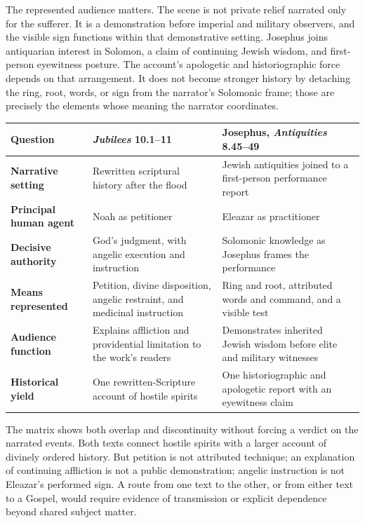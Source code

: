 The represented audience matters. The scene is not private relief narrated
only for the sufferer. It is a demonstration before imperial and military
observers, and the visible sign functions within that demonstrative setting.
Josephus joins antiquarian interest in Solomon, a claim of continuing Jewish
wisdom, and first-person eyewitness posture. The account's apologetic and
historiographic force depends on that arrangement. It does not become stronger
history by detaching the ring, root, words, or sign from the narrator's
Solomonic frame; those are precisely the elements whose meaning the narrator
coordinates.

\begin{center}
\small
\begin{tabularx}{\textwidth}{@{}>{\bfseries}p{}
  >{\RaggedRight\arraybackslash}X
  >{\RaggedRight\arraybackslash}X@{}}
\toprule
Question & \emph{Jubilees} 10.1--11 & Josephus, \emph{Antiquities} 8.45--49 \\
\midrule
Narrative setting & Rewritten scriptural history after the flood & Jewish
antiquities joined to a first-person performance report \\
Principal human agent & Noah as petitioner & Eleazar as practitioner \\
Decisive authority & God's judgment, with angelic execution and instruction &
Solomonic knowledge as Josephus frames the performance \\
Means represented & Petition, divine disposition, angelic restraint, and
medicinal instruction & Ring and root, attributed words and command, and a
visible test \\
Audience function & Explains affliction and providential limitation to the
work's readers & Demonstrates inherited Jewish wisdom before elite and military
witnesses \\
Historical yield & One rewritten-Scripture account of hostile spirits & One
historiographic and apologetic report with an eyewitness claim \\
\bottomrule
\end{tabularx}
\end{center}

The matrix shows both overlap and discontinuity without forcing a verdict on
the narrated events. Both texts connect hostile spirits with a larger account
of divinely ordered history. But petition is not attributed technique; an
explanation of continuing affliction is not a public demonstration; angelic
instruction is not Eleazar's performed sign. A route from one text to the
other, or from either text to a Gospel, would require evidence of transmission
or explicit dependence beyond shared subject matter.

